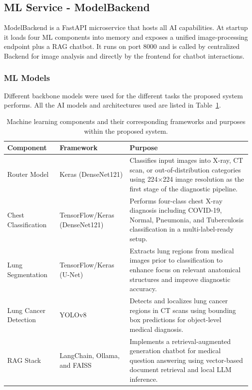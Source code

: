 \subsection{ML Service - ModelBackend}
ModelBackend is a FastAPI microservice that hosts all AI capabilities. At startup it loads four ML components into memory and exposes a unified image-processing endpoint plus a RAG chatbot. It runs on port 8000 and is called by centralized Backend for image analysis and directly by the frontend for chatbot interactions.

\subsubsection{ML Models}
Different backbone models were used for the different tasks the proposed system performs. All the AI models and architectures used are listed in Table~\ref{tab:ml_components}.

\begin{table}[htbp]
	\centering
	\caption{Machine learning components and their corresponding frameworks and purposes within the proposed system.}
	\label{tab:ml_components}
	\begin{tabular}{|p{4cm}|p{5cm}|p{6cm}|}
		\hline
		\textbf{Component} & \textbf{Framework} & \textbf{Purpose} \\
		\hline
		
		Router Model &
		Keras (DenseNet121) &
		Classifies input images into X-ray, CT scan, or out-of-distribution categories using 224×224 image resolution as the first stage of the diagnostic pipeline. \\
		\hline
		
		Chest Classification &
		TensorFlow/Keras (DenseNet121) &
		Performs four-class chest X-ray diagnosis including COVID-19, Normal, Pneumonia, and Tuberculosis classification in a multi-label-ready setup. \\
		\hline
		
		Lung Segmentation &
		TensorFlow/Keras (U-Net) &
		Extracts lung regions from medical images prior to classification to enhance focus on relevant anatomical structures and improve diagnostic accuracy. \\
		\hline
		
		Lung Cancer Detection &
		YOLOv8 &
		Detects and localizes lung cancer regions in CT scans using bounding box predictions for object-level medical diagnosis. \\
		\hline
		
		RAG Stack &
		LangChain, Ollama, and FAISS &
		Implements a retrieval-augmented generation chatbot for medical question answering using vector-based document retrieval and local LLM inference. \\
		\hline
		
	\end{tabular}
\end{table}


